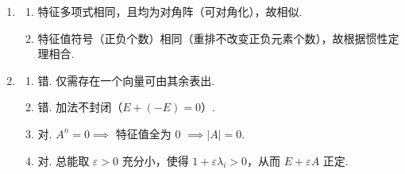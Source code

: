 \begin{enumerate}
    \item
    \begin{enumerate}
        \item 特征多项式相同，且均为对角阵（可对角化），故相似.
        \item 特征值符号（正负个数）相同（重排不改变正负元素个数），故根据惯性定理相合.
    \end{enumerate}

    \item
    \begin{enumerate}
        \item 错. 仅需存在一个向量可由其余表出.
        \item 错. 加法不封闭（$E + (-E) = 0$）.
        \item 对. $A^n=0 \implies$ 特征值全为 0 $\implies |A|=0$.
        \item 对. 总能取 $\varepsilon>0$ 充分小，使得 $1 + \varepsilon \lambda_i > 0$，从而 $E + \varepsilon A$ 正定.
    \end{enumerate}
\end{enumerate}

\clearpage
